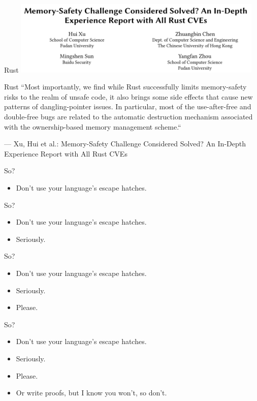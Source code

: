 \documentclass[aspectratio=169,14pt]{beamer}
\begin{document}
  \begin{frame}{Rust}
    \includegraphics[width=12cm]{rust_memory}
  \end{frame}
  \begin{frame}{Rust}
  ``Most importantly, we find while Rust successfully limits memory-safety risks to
  the realm of unsafe code, it also brings some side effects that cause new
  patterns of dangling-pointer issues. In particular, most of the use-after-free
  and double-free bugs are related to the automatic destruction mechanism
  associated with the ownership-based memory management scheme.``

  --- Xu, Hui et al.: Memory-Safety Challenge Considered Solved? An In-Depth Experience Report with All Rust CVEs
  \end{frame}
  \begin{frame}{So?}
    \begin{itemize}
      \item Don’t use your language’s escape hatches.
    \end{itemize}
  \end{frame}
  \begin{frame}{So?}
    \begin{itemize}
      \item Don’t use your language’s escape hatches.
      \item Seriously.
    \end{itemize}
  \end{frame}
  \begin{frame}{So?}
    \begin{itemize}
      \item Don’t use your language’s escape hatches.
      \item Seriously.
      \item Please.
    \end{itemize}
  \end{frame}
  \begin{frame}{So?}
    \begin{itemize}
      \item Don’t use your language’s escape hatches.
      \item Seriously.
      \item Please.
      \item Or write proofs, but I know you won’t, so don’t.
    \end{itemize}
  \end{frame}
\end{document}
